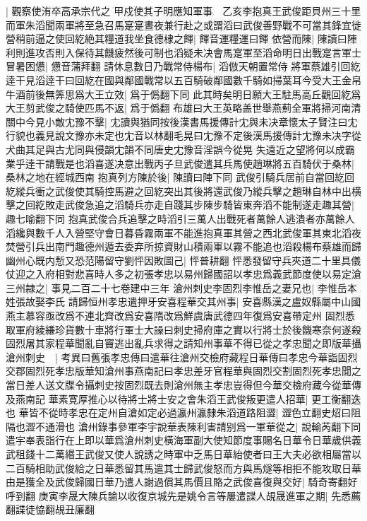 |{
	觀察使洧卒高承宗代之}
甲戍使其子明應知軍事　乙亥李抱真王武俊距貝州三十里而軍朱滔聞兩軍將至急召馬寔寔晝夜兼行赴之或謂滔曰武俊善野戰不可當其鋒宜徙營稍前逼之使回紇絶其糧道我坐食德棣之餫|{
	餫音運糧運曰餫}
依營而陳|{
	陳讀曰陣}
利則進攻否則入保待其饑疲然後可制也滔疑未决會馬寔軍至滔命明日出戰寔言軍士冒暑困憊|{
	憊音蒲拜翻}
請休息數日乃戰常侍楊布|{
	滔倣天朝置常侍}
將軍蔡雄引回紇逹干見滔逹干曰回紇在國與鄰國戰常以五百騎破鄰國數千騎如掃葉耳今受大王金帛牛酒前後無筭思爲大王立效|{
	爲于僞翻下同}
此其時矣明日願大王駐馬高丘觀回紇爲大王剪武俊之騎使匹馬不返|{
	爲于僞翻}
布雄曰大王英略盖世舉燕薊全軍將掃河南清關中今見小敵冘豫不擊|{
	冘讀與猶同按後漢書馬援傳計冘與未决章懷太子賢注曰冘行貌也義見說文豫亦未定也冘音以林翻毛晃曰冘豫不定後漢馬援傳計冘豫未决字從犬曲其足與古尤同與侵韻冘韻不同唐史冘豫音淫誤今從晃}
失遠近之望將何以成霸業乎逹干請戰是也滔喜遂决意出戰丙子旦武俊遣其兵馬使趙琳將五百騎伏于桑林|{
	桑林之地在經城西南}
抱真列方陳於後|{
	陳讀曰陣下同}
武俊引騎兵居前自當回紇回紇縱兵衝之武俊使其騎控馬避之回紇突出其後將還武俊乃縱兵擊之趙琳自林中出横擊之回紇敗走武俊急追之滔騎兵亦走自踐其步陳步騎皆東奔滔不能制遂走趣其營|{
	趣七喻翻下同}
抱真武俊合兵追擊之時滔引三萬人出戰死者萬餘人逃潰者亦萬餘人滔纔與數千人入營堅守會日暮昏霧兩軍不能進抱真軍其營之西北武俊軍其東北滔夜焚營引兵出南門趣德州遁去委弃所掠資財山積兩軍以霧不能追也滔殺楊布蔡雄而歸幽州心既内慙又恐范陽留守劉怦因敗圖己|{
	怦普耕翻}
怦悉發留守兵夾道二十里具儀仗迎之入府相對悲喜時人多之初張孝忠以易州歸國詔以孝忠爲義武節度使以易定滄三州隷之|{
	事見二百二十七卷建中三年}
滄州刺史李固烈李惟岳之妻兄也|{
	李惟岳本姓張故娶李氏}
請歸恒州孝忠遣押牙安喜程華交其州事|{
	安喜縣漢之盧奴縣屬中山國燕主慕容亟改爲不連北齊改爲安喜隋改爲鮮虞唐武德四年復爲安喜帶定州}
固烈悉取軍府綾縑珍貨數十車將行軍士大譟曰刺史掃府庫之實以行將士於後饑寒奈何遂殺固烈屠其家程華聞亂自竇逃出亂兵求得之請知州事華不得已從之孝忠聞之即版華攝滄州刺史　|{
	考異曰舊張孝忠傳曰遣華往滄州交檢府藏程日華傳曰孝忠今華詣固烈交郡固烈死孝忠版華知滄州事燕南記曰孝忠差牙官程華與固烈交割固烈死孝忠聞之當日差人送文牒令攝刺史按固烈既去則滄州無主孝忠豈得但今華交檢府藏今從華傳及燕南記}
華素寛厚推心以待將士將士安之會朱滔王武俊叛更遣人招華|{
	更工衡翻迭也}
華皆不從時孝忠在定州自滄如定必過瀛州瀛隸朱滔道路阻澀|{
	澀色立翻史炤曰阻隔也澀不通滑也}
滄州錄事參軍李宇說華表陳利害請别爲一軍華從之|{
	說輸芮翻下同}
遣宇奉表詣行在上即以華爲滄州刺史橫海軍副大使知節度事賜名日華令日華歲供義武租錢十二萬緡王武俊又使人說誘之時軍中乏馬日華紿使者曰王大夫必欲相屬當以二百騎相助武俊給之日華悉留其馬遣其士歸武俊怒而方與馬燧等相拒不能攻取日華由是獲全及武俊歸國日華乃遣人謝過償其馬價且賂之武俊喜復與交好|{
	騎奇寄翻好呼到翻}
庚寅李晟大陳兵諭以收復京城先是姚令言等屢遣諜人覘晟進軍之期|{
	先悉薦翻諜徒恊翻覘丑廉翻}
